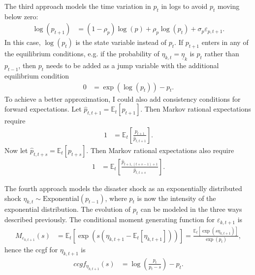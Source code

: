 \documentclass[12 pt, oneside]{article}
\theoremstyle{definition}
\theoremstyle{definition}
\theoremstyle{definition}
\newcommand{\E}{\mathbb{E}}
\begin{document}
The third approach models the time variation in $p_t$ in logs to avoid $p_t$ moving below zero:
\begin{align}
  \log(p_{t + 1}) & = (1 - \rho_p) \log(p) + \rho_p \log(p_t) + \sigma_p \varepsilon_{p, t + 1}.
\end{align}
In this case, $\log(p_t)$ is the state variable instead of $p_t$. If $p_{t + 1}$ enters in any of the equilibrium conditions, e.g. if the probability of $\eta_{k, t} = \underline{\eta}_k$ is $p_t$ rather than $p_{t - 1}$, then $p_t$ needs to be added as a jump variable with the additional equilibrium condition
\begin{align}
  0 & = \exp(\log(p_t)) - p_t.
\end{align}
To achieve a better approximation, I could also add consistency conditions for forward expectations. Let $\hat{p}_{t, t + 1} = \E_t[p_{t + 1}]$. Then Markov rational expectations require
\begin{align*}
  1 & = \E_t\left[\frac{p_{t + 1}}{\hat{p}_{t, t + 1}}\right].
\end{align*}
Now let $\hat{p}_{t, t + s} = \E_t[p_{t + s}]$. Then Markov rational expectations also require
\begin{align*}
  1 & = \E_t\left[\frac{\hat{p}_{t + 1, (t + s - 1) + 1}}{\hat{p}_{t, t + s}}\right].
\end{align*}

The fourth approach models the disaster shock as an exponentially distributed shock $\eta_{k, t} \sim \text{Exponential}(p_{t - 1})$, where $p_t$ is now the intensity of the exponential distribution. The evolution of $p_t$ can be modeled in the three ways described previously. The conditional moment generating function for $\varepsilon_{k, t + 1}$ is
\begin{align*}
  M_{\varepsilon_{k, t + 1}}(s) & = \E_t[\exp(s (\eta_{k, t + 1} - \E_t[\eta_{k, t + 1}]))] = \frac{\E_t[\exp(s \eta_{k, t + 1})]}{\exp(p_t)},
\end{align*}
hence the ccgf for $\eta_{k, t + 1}$ is
\begin{align}
  ccgf_{\eta_{k, t + 1}}(s) & = \log\left(\frac{p_t}{p_t - s}\right) - p_t.
\end{align}
\end{document}
